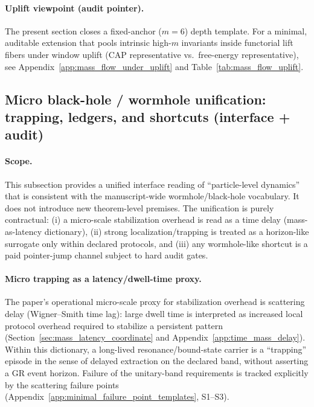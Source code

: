 \paragraph{Uplift viewpoint (audit pointer).}
\AuditTag The present section closes a fixed-anchor ($m=6$) depth template.
For a minimal, auditable extension that pools intrinsic high-$m$ invariants inside functorial lift fibers
under window uplift (CAP representative vs.\ free-energy representative), see Appendix~\ref{app:mass_flow_under_uplift}
and Table~\ref{tab:mass_flow_uplift}.

\subsection{Micro black-hole / wormhole unification: trapping, ledgers, and shortcuts (interface + audit)}
\label{subsec:micro_bh_wh_particle_unification}

\paragraph{Scope.}
\InterfaceTag This subsection provides a unified interface reading of ``particle-level dynamics'' that is consistent with the manuscript-wide wormhole/black-hole vocabulary.
It does not introduce new theorem-level premises.
The unification is purely contractual: (i) a micro-scale stabilization overhead is read as a time delay (mass-as-latency dictionary),
(ii) strong localization/trapping is treated as a horizon-like surrogate only within declared protocols,
and (iii) any wormhole-like shortcut is a paid pointer-jump channel subject to hard audit gates.

\paragraph{Micro trapping as a latency/dwell-time proxy.}
\InterfaceTag The paper's operational micro-scale proxy for stabilization overhead is scattering delay (Wigner--Smith time lag):
large dwell time is interpreted as increased local protocol overhead required to stabilize a persistent pattern
(Section~\ref{sec:mass_latency_coordinate} and Appendix~\ref{app:time_mass_delay}).
Within this dictionary, a long-lived resonance/bound-state carrier is a ``trapping'' episode in the sense of delayed extraction on the declared band,
without asserting a GR event horizon.
Failure of the unitary-band requirements is tracked explicitly by the scattering failure points (Appendix~\ref{app:minimal_failure_point_templates}, S1--S3).

